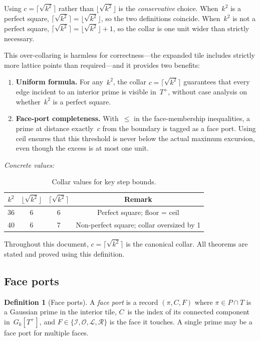 \documentclass[11pt,a4paper]{article}
\newcommand{\Gk}{G_k}
\newcommand{\fI}{\mathcal{I}}
\newcommand{\fO}{\mathcal{O}}
\newcommand{\fL}{\mathcal{L}}
\newcommand{\fR}{\mathcal{R}}
\newcommand{\Tplus}{T^+}
\theoremstyle{definition}
\newtheorem{definition}{Definition}[section]
\theoremstyle{plain}
\theoremstyle{remark}
\begin{document}
Using $c = \lceil\sqrt{k^2}\rceil$ rather than $\lfloor\sqrt{k^2}\rfloor$ is the \emph{conservative} choice.  When~$k^2$ is a perfect square, $\lceil\sqrt{k^2}\rceil = \lfloor\sqrt{k^2}\rfloor$, so the two definitions coincide.  When~$k^2$ is not a perfect square, $\lceil\sqrt{k^2}\rceil = \lfloor\sqrt{k^2}\rfloor + 1$, so the collar is one unit wider than strictly necessary.

This over-collaring is harmless for correctness---the expanded tile includes strictly more lattice points than required---and it provides two benefits:
\begin{enumerate}
  \item \textbf{Uniform formula.}  For any~$k^2$, the collar $c = \lceil\sqrt{k^2}\rceil$ guarantees that every edge incident to an interior prime is visible in~$\Tplus$, without case analysis on whether~$k^2$ is a perfect square.
  \item \textbf{Face-port completeness.}  With~$\le$ in the face-membership inequalities, a prime at distance exactly~$c$ from the boundary is tagged as a face port.  Using ceil ensures that this threshold is never below the actual maximum excursion, even though the excess is at most one unit.
\end{enumerate}

\noindent\emph{Concrete values:}

\begin{table}[ht]
\centering
\begin{tabular}{@{}cccc@{}}
\toprule
$k^2$ & $\lfloor\sqrt{k^2}\rfloor$ & $\lceil\sqrt{k^2}\rceil$ & Remark \\
\midrule
36 & 6 & 6 & Perfect square; floor = ceil \\
40 & 6 & 7 & Non-perfect square; collar oversized by 1 \\
\bottomrule
\end{tabular}
\caption{Collar values for key step bounds.}
\label{tab:collar-values}
\end{table}

Throughout this document, $c = \lceil\sqrt{k^2}\rceil$ is the canonical collar.  All theorems are stated and proved using this definition.

\subsection{Face ports}

\begin{definition}[Face ports]\label{def:face-ports}
A \emph{face port} is a record $(\pi, C, F)$ where $\pi \in P \cap T$ is a Gaussian prime in the interior tile, $C$~is the index of its connected component in~$\Gk[\Tplus]$, and $F \in \{\fI, \fO, \fL, \fR\}$ is the face it touches.  A single prime may be a face port for multiple faces.
\end{definition}
\end{document}
